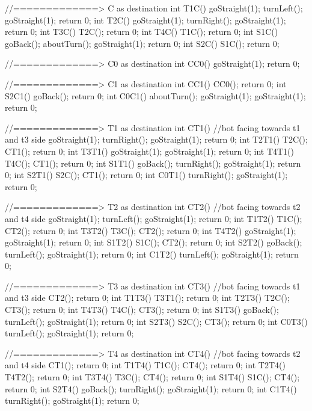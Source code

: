 //=============> C as destination
int T1C()
{
    goStraight(1);
	turnLeft();
	goStraight(1);
    return 0;
}
int T2C()
{
    goStraight(1);
	turnRight();
	goStraight(1);
    return 0;
}
int T3C()
{
	T2C();
    return 0;
}
int T4C()
{
    T1C();
    return 0;
}
int S1C()
{
	goBack();
	aboutTurn();
	goStraight(1);
	return 0;
}
int S2C()
{
	S1C();
	return 0;
}

//=============> C0 as destination
int CC0()
{
	goStraight(1);
	return 0;
}

//=============> C1 as destination
int CC1()
{
	CC0();
	return 0;
}
int S2C1()
{
	goBack();
	return 0;
}
int C0C1()
{
	aboutTurn();
	goStraight(1);
	goStraight(1);
	return 0;
}

//=============> T1 as destination
int CT1()
{
    //bot facing towards t1 and t3 side
    goStraight(1);
    turnRight();
    goStraight(1);
    return 0;
}
int T2T1()
{
	T2C();
	CT1();
	return 0;
}
int T3T1()
{
	goStraight(1);
	goStraight(1);
	return 0;
}
int T4T1()
{
	T4C();
	CT1();
	return 0;
}
int S1T1()
{
	goBack();
	turnRight();
	goStraight(1);
	return 0;
}
int S2T1()
{
	S2C();
	CT1();
	return 0;
}
int C0T1()
{
	turnRight();
	goStraight(1);
	return 0;
}

//=============> T2 as destination
int CT2()
{
    //bot facing towards t2 and t4 side
    goStraight(1);
    turnLeft();
    goStraight(1);
    return 0;
}
int T1T2()
{
	T1C();
	CT2();
	return 0;
}
int T3T2()
{
	T3C();
	CT2();
	return 0;
}
int T4T2()
{
	goStraight(1);
	goStraight(1);
	return 0;
}
int S1T2()
{
	S1C();
	CT2();
	return 0;
}
int S2T2()
{
	goBack();
	turnLeft();
	goStraight(1);
	return 0;
}
int C1T2()
{
	turnLeft();
	goStraight(1);
	return 0;
}

//=============> T3 as destination
int CT3()
{
    //bot facing towards t1 and t3 side
    CT2();
    return 0;
}
int T1T3()
{
	T3T1();
	return 0;
}
int T2T3()
{
	T2C();
	CT3();
	return 0;
}
int T4T3()
{
	T4C();
	CT3();
	return 0;
}
int S1T3()
{
	goBack();
	turnLeft();
	goStraight(1);
	return 0;
}
int S2T3()
{
	S2C();
	CT3();
	return 0;
}
int C0T3()
{
	turnLeft();
	goStraight(1);
	return 0;
}

//=============> T4 as destination
int CT4()
{
    //bot facing towards t2 and t4 side
    CT1();
    return 0;
}
int T1T4()
{
	T1C();
	CT4();
	return 0;
}
int T2T4()
{
	T4T2();
	return 0;
}
int T3T4()
{
	T3C();
	CT4();
	return 0;
}
int S1T4()
{
	S1C();
	CT4();
	return 0;
}
int S2T4()
{
	goBack();
	turnRight();
	goStraight(1);
	return 0;
}
int C1T4()
{
	turnRight();
	goStraight(1);
	return 0;
}

